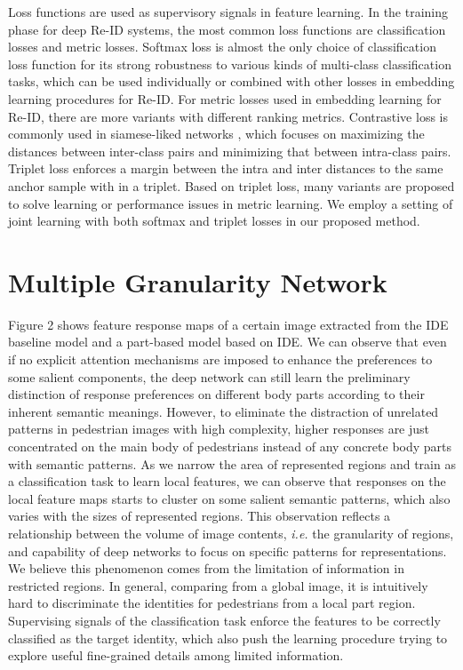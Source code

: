 \documentclass[sigconf]{acmart}
\begin{document}
Loss functions are used as supervisory signals in feature learning. In the training phase for deep Re-ID systems, the most common loss functions are classification losses and metric losses. Softmax loss is almost the only choice of classification loss function for its strong robustness to various kinds of multi-class classification tasks, which can be used individually \cite{ahmed2015improved,zheng2016person,xiao2016learnin,sun2017beyond,liu2017hydraplus,yao2017deep,li2017learning,li2018harmoniou} or combined with other losses \cite{li2014deepreid,cheng2016perso,zhang2017alignedreid,bai2017deep} in embedding learning procedures for Re-ID. For metric losses used in embedding learning for Re-ID, there are more variants with different ranking metrics. Contrastive loss \cite{hadsell2006dimensionality} is commonly used in siamese-liked networks \cite{varior2016gated}, which focuses on maximizing the distances between inter-class pairs and minimizing that between intra-class pairs. Triplet loss \cite{hoffer2015deep,schroff2015facenet} enforces a margin between the intra and inter distances to the same anchor sample with in a triplet. Based on triplet loss, many variants \cite{cheng2016perso,hermans2017defense,chen2017beyond,song2016deep} are proposed to solve learning or performance issues in metric learning. We employ a setting of joint learning with both softmax and triplet losses in our proposed method.



\section{Multiple Granularity Network}
Figure 2 shows feature response maps of a certain image extracted from the IDE baseline model \cite{zheng2016person} and a part-based model based on IDE. We can observe that even if no explicit attention mechanisms are imposed to enhance the preferences to some salient components, the deep network can still learn the preliminary distinction of response preferences on different body parts according to their inherent semantic meanings. However, to eliminate the distraction of unrelated patterns in pedestrian images with high complexity, higher responses are just concentrated on the main body of pedestrians instead of any concrete body parts with semantic patterns. As we narrow the area of represented regions and train as a classification task to learn local features, we can observe that responses on the local feature maps starts to cluster on some salient semantic patterns, which also varies with the sizes of represented regions. This observation reflects a relationship between the volume of image contents, \textit{i.e.} the granularity of regions, and capability of deep networks to focus on specific patterns for representations. We believe this phenomenon comes from the limitation of information in restricted regions. In general, comparing from a global image, it is intuitively hard to discriminate the identities for pedestrians from a local part region. Supervising signals of the classification task enforce the features to be correctly classified as the target identity, which also push the learning procedure trying to explore useful fine-grained details among limited information. 
\end{document}
